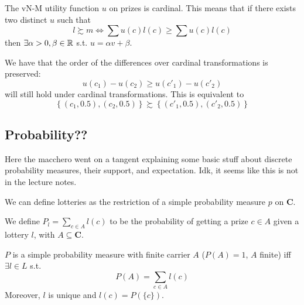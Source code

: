 \documentclass[12pt]{extarticle}
\begin{document}
The vN-M utility function $u$ on prizes is cardinal.
This means that if there exists two distinct $u$ such that
\begin{equation}
    l \succsim m \iff \sum u(c) l(c) \geq \sum u(c) l(c)
\end{equation}
then $\exists \alpha > 0, \beta \in \mathbb{R}$ s.t. $u = \alpha v + \beta$.

We have that the order of the differences over cardinal transformations is preserved:
\begin{equation}
    u(c_1) - u(c_2) \geq u(c'_1) - u(c'_2)
\end{equation}
will still hold under cardinal transformations.
This is equivalent to
\begin{equation}
    \left\{ (c_1, 0.5),  (c_2, 0.5) \right\} \succsim \left\{ (c'_1, 0.5),  (c'_2, 0.5) \right\}
\end{equation}

\subsection{Probability??}

Here the macchero went on a tangent explaining some basic stuff about discrete probability measures, their support, and expectation.
Idk, it seems like this is not in the lecture notes.

We can define lotteries as the restriction of a simple probability measure $p$ on $\bm C$.

We define $P_l = \sum_{c \in A} l(c)$ to be the probability of getting a prize $c \in A$ given a lottery $l$, with $A \subseteq \bm C$.

\begin{proposition}{}{}
    $P$ is a simple probability measure with finite carrier $A$ ($P(A)=1$, $A$ finite) iff $\exists l \in L$ s.t.
    \begin{equation}
        P(A) = \sum_{c \in A} l(c)
    \end{equation}
    Moreover, $l$ is unique and $l(c) = P(\{c\})$.
\end{proposition}
\end{document}
